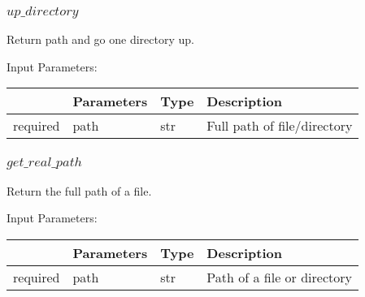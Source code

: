 \documentclass[
	ngerman,
	accentcolor=9c,%
	type=intern,
	marginpar=false
	]{tudapub}
\begin{document}
\vspace{1cm}
\subsubsection{$up\_directory$}
\noindent Return path and go one directory up.


\vspace{0.5cm}
\noindent Input Parameters:
\vspace{0.5cm}

\begin{tabular}{|p{}|p{}|p{}| p{}|}
\hline
 & \textbf{Parameters} & \textbf{Type} & \textbf{Description} \\
\hline
required & path & str & Full path of file/directory \\
\hline
\end{tabular}
\vspace{1cm}

\subsubsection{$get\_real\_path$}
\noindent Return the full path of a file.


\vspace{0.5cm}
\noindent Input Parameters:
\vspace{0.5cm}

\begin{tabular}{|p{}|p{}|p{}| p{}|}
\hline
 & \textbf{Parameters} & \textbf{Type} & \textbf{Description} \\
\hline
required & path & str & Path of a file or directory \\
\hline
\end{tabular}
\vspace{1cm}
\end{document}
